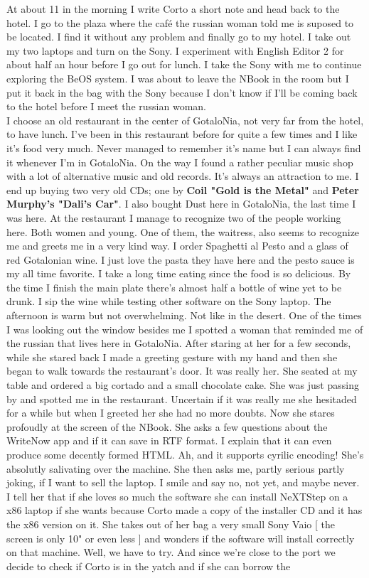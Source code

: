 \documentclass[11pt,twoside,a4paper]{book}
\begin{document}
\begin{multicols*}{2}
    At about 11 in the morning I write Corto a short note and head back to the hotel. I go to the plaza where the caf{\'e} the russian woman told me is suposed to be located. I find it without any problem and finally go to my hotel. I take out my two laptops and turn on the Sony. I experiment with English Editor 2 for about half an hour before I go out for lunch. I take the Sony with me to continue exploring the BeOS system. I was about to leave the NBook in the room but I put it back in the bag with the Sony because I don't know if I'll be coming back to the hotel before I meet the russian woman. ~\\

    I choose an old restaurant in the center of GotaloNia, not very far from the hotel, to have lunch. I've been in this restaurant before for quite a few times and I like it's food very much. Never managed to remember it's name but I can always find it whenever I'm in GotaloNia. On the way I found a rather peculiar music shop with a lot of alternative music and old records. It's always an attraction to me. I end up buying two very old CDs; one by \textbf{Coil "Gold is the Metal"} and \textbf{Peter Murphy's "Dali's Car"}. I also bought Dust here in GotaloNia, the last time I was here. At the restaurant I manage to recognize two of the people working here. Both women and young. One of them, the waitress, also seems to recognize me and greets me in a very kind way. I order Spaghetti al Pesto and a glass of red Gotalonian wine. I just love the pasta they have here and the pesto sauce is my all time favorite. I take a long time eating since the food is so delicious. By the time I finish the main plate there's almost half a bottle of wine yet to be drunk. I sip the wine while testing other software on the Sony laptop. The afternoon is warm but not overwhelming. Not like in the desert. One of the times I was looking out the window besides me I spotted a woman that reminded me of the russian that lives here in GotaloNia. After staring at her for a few seconds, while she stared back I made a greeting gesture with my hand and then she began to walk towards the restaurant's door. It was really her. She seated at my table and ordered a big cortado and a small chocolate cake. She was just passing by and spotted me in the restaurant. Uncertain if it was really me she hesitaded for a while but when I greeted her she had no more doubts. Now she stares profoudly at the screen of the NBook. She asks a few questions about the WriteNow app and if it can save in RTF format. I explain that it can even produce some decently formed HTML. Ah, and it supports cyrilic encoding! She's absolutly salivating over the machine. She then asks me, partly serious partly joking, if I want to sell the laptop. I smile and say no, not yet, and maybe never. I tell her that if she loves so much the software she can install NeXTStep on a x86 laptop if she wants because Corto made a copy of the installer CD and it has the x86 version on it. She takes out of her bag a very small Sony Vaio [ the screen is only 10" or even less ] and wonders if the software will install correctly on that machine. Well, we have to try. And since we're close to the port we decide to check if Corto is in the yatch and if she can borrow the 
\end{multicols*}
\end{document}
